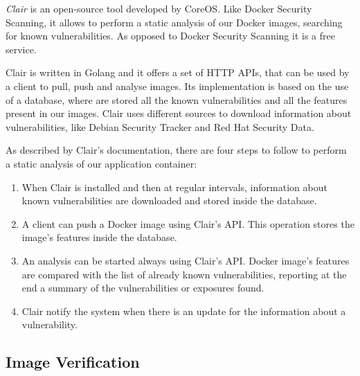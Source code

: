 \documentclass[a4paper,12pt]{article}
\begin{document}
\textit{Clair} \cite{clair} is an open-source tool developed by CoreOS. Like
Docker Security Scanning, it allows to perform a static analysis of our Docker
images, searching for known vulnerabilities. As opposed to Docker Security
Scanning it is a free service. \par Clair is written in Golang and it offers a
set of HTTP APIs, that can be used by a client to pull, push and analyse images.
Its implementation is based on the use of a database, where are stored all the
known vulnerabilities and all the features present in our images. Clair uses
different sources to download information about vulnerabilities, like Debian
Security Tracker and Red Hat Security Data. \par As described by Clair's
documentation, there are four steps to follow to perform a static analysis of
our application container:
\begin{enumerate}
  \item When Clair is installed and then at regular intervals, information about
  known vulnerabilities are downloaded and stored inside the database.
  \item A client can push a Docker image using Clair's API. This operation
  stores the image's features inside the database.
  \item An analysis can be started always using Clair's API. Docker image's
  features are compared with the list of already known vulnerabilities,
  reporting at the end a summary of the vulnerabilities or exposures found.
  \item Clair notify the system when there is an update for the information
  about a vulnerability.
\end{enumerate}

\subsection{Image Verification}
\end{document}
